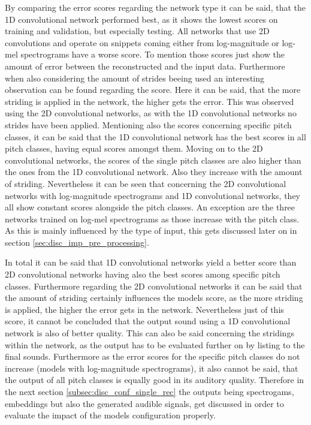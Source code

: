 By comparing the error scores regarding the network type it can be said, that the 1D convolutional network performed best, as it shows the lowest scores on training and validation, but especially testing. All networks that use 2D convolutions and operate on snippets coming either from log-magnitude or log-mel spectrograms have a worse score. To mention those scores just show the amount of error between the reconstructed and the input data. Furthermore when also considering the amount of strides beeing used an interesting observation can be found regarding the score. Here it can be said, that the more striding is applied in the network, the higher gets the error. This was observed using the 2D convolutional networks, as with the 1D convolutional networks no strides have been applied. Mentioning also the scores concerning specific pitch classes, it can be said that the 1D convolutional network has the best scores in all pitch classes, having equal scores amongst them. Moving on to the 2D convolutional networks, the scores of the single pitch classes are also higher than the ones from the 1D convolutional network. Also they increase with the amount of striding. Nevertheless it can be seen that concerning the 2D convolutional networks with log-magnitude spectrograms and 1D convolutional networks, they all show constant scores alongside the pitch classes. An exception are the three networks trained on log-mel spectrograms as those increase with the pitch class. As this is mainly influenced by the type of input, this gets discussed later on in section \ref{sec:disc_imp_pre_processing}. 

In total it can be said that 1D convolutional networks yield a better score than 2D convolutional networks having also the best scores among specific pitch classes. Furthermore regarding the 2D convolutional networks it can be said that the amount of striding certainly influences the models score, as the more striding is applied, the higher the error gets in the network. Nevertheless just of this score, it cannot be concluded that the output sound using a 1D convolutional network is also of better quality. This can also be said concerning the stridings within the network, as the output has to be evaluated further on by listing to the final sounds. Furthermore as the error scores for the specific pitch classes do not increase (models with log-magnitude spectrograms), it also cannot be said, that the output of all pitch classes is equally good in its auditory quality. Therefore in the next section \ref{subsec:disc_conf_single_rec} the outputs being spectrogams, embeddings but also the generated audible signals, get discussed in order to evaluate the impact of the models configuration properly.

